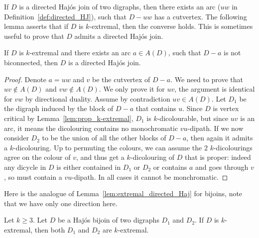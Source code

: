  If $D$ is a directed Haj\'os join of two digraphs, then there exists an arc ($uw$ in Definition~\ref{def:directed_HJ}), such that $D-uw$ has a cutvertex. The following lemma asserts that if $D$ is $k$-extremal, then the converse holds. This is sometimes useful to prove that $D$ admits a directed Haj\'os join. 
 \begin{lemma}\label{lem:HJsufficient}
     If $D$ is $k$-extremal and there exists an arc $a\in A(D)$, such that $D-a$ is not biconnected, then $D$ is a directed Haj\'os join.
 \end{lemma}
 \begin{proof}
     Denote $a=uw$ and $v$ be the cutvertex of 
     $D-a$. We need to prove that $uv\not\in A(D)$ and $vw\not\in A(D)$. We only prove it for $uv$, the argument is identical for $vw$ by directional duality. Assume by contradiction $uv\in A(D)$. Let $D_1$ be the digraph induced by the block of $D-a$ that contains $u$. Since $D$ is vertex critical by Lemma~\ref{lem:prop_k-extremal}, $D_1$ is $k$-dicolourable, but since $uv$ is an arc, it means the dicolouring contains no monochromatic $vu$-dipath. If we now consider $D_2$ to be the union of all the other blocks of $D-a$, then again it admits a $k$-dicolouring. Up to permuting the colours, we can assume the $2$ $k$-dicolourings agree on the colour of $v$, and thus get a $k$-dicolouring of $D$ that is proper: indeed any dicycle in $D$ is either contained in $D_1$ or $D_2$ or contains $a$ and goes through $v$, so must contain a $vu$-dipath. In all  cases it cannot be monchromatic. 
 \end{proof}

 
Here is the analogue of Lemma~\ref{lem:extremal_directed_Haj} for bijoins, note that we have only one direction here.

\begin{lemma}\label{lem:extremal_bijoin_Haj}
    Let $k \geq 3$. Let $D$ be a Haj\'os bijoin of two digraphs $D_1$ and $D_2$. If $D$ is $k$-extremal, then both $D_1$ and $D_2$ are $k$-extremal.
\end{lemma}

